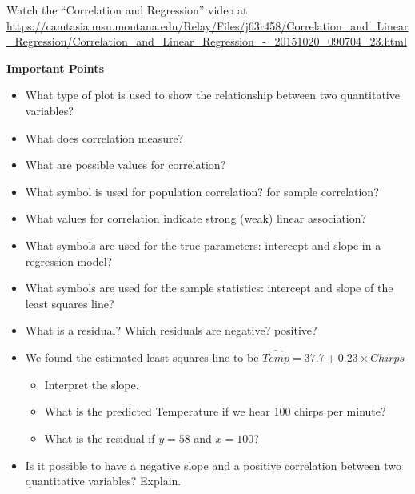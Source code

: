 \def\theTopic{Reading 15}


Watch the ``Correlation and Regression'' video at 
\url{https://camtasia.msu.montana.edu/Relay/Files/j63r458/Correlation_and_Linear_Regression/Correlation_and_Linear_Regression_-_20151020_090704_23.html }

\begin{center}
  {\bf Important Points}
\end{center}

\begin{itemize}
\item What type of plot is used to show the relationship between two
  quantitative variables?\vfill
\item What does correlation measure?\vfill
\item What are possible values for correlation?  \vfill
\item What symbol is used for population correlation?  for sample
  correlation? \vfill  
\item What values for correlation indicate strong (weak) linear
  association?\vfill 
\item  What symbols are used for the true parameters: intercept and
  slope in a regression model?\vfill
\item  What symbols are used for the sample statistics: intercept and
  slope of the least squares line? \vfill
\item  What is a residual? Which residuals are negative? positive?\vfill
\item  We found the estimated least squares line to be
      $\widehat{Temp} = 37.7 +  0.23\times{Chirps}$ 
      \begin{itemize}
      \item Interpret the slope.\vfill
      \item What is the predicted Temperature if we hear 100 chirps per
        minute? \vfill
      \item What is the residual if $y = 58$ and $x = 100$?\vfill
      \end{itemize}
\item Is it possible to have a negative slope and a positive
  correlation between two quantitative variables? Explain.\vspace*{\fill}
\end{itemize}